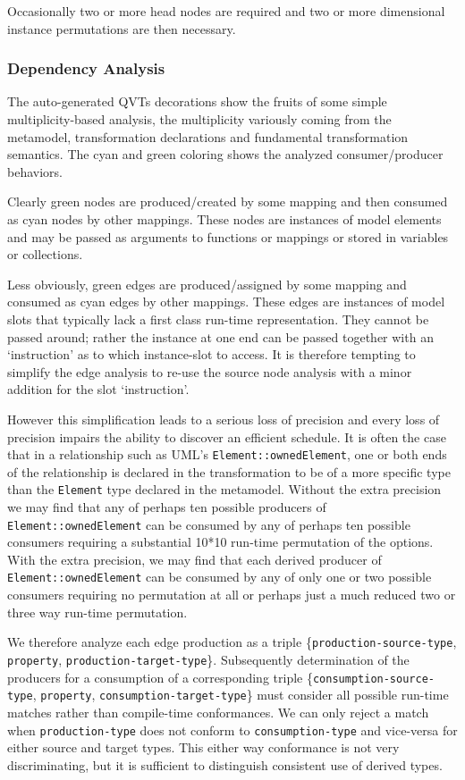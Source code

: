 \documentclass{jot}
\begin{document}
Occasionally two or more head nodes are required and two or more dimensional instance permutations are then necessary.

\subsubsection{Dependency Analysis}

The auto-generated QVTs decorations show the fruits of some simple multiplicity-based analysis, the multiplicity variously coming from the metamodel, transformation declarations and fundamental transformation semantics. The cyan and green coloring shows the analyzed consumer/producer behaviors.

Clearly green nodes are produced/created by some mapping and then consumed as cyan nodes by other mappings. These nodes are instances of model elements and may be passed as arguments to functions or mappings or stored in variables or collections.

Less obviously, green edges are produced/assigned by some mapping and consumed as cyan edges by other mappings. These edges are instances of model slots that typically lack a first class run-time representation. They cannot be passed around; rather the instance at one end can be passed together with an `instruction' as to which instance-slot to access. It is therefore tempting to simplify the edge analysis to re-use the source node analysis with a minor addition for the slot `instruction'.

However this simplification leads to a serious loss of precision and every loss of precision impairs the ability to discover an efficient schedule. It is often the case that in a relationship such as UML's \verb|Element::ownedElement|, one or both ends of the relationship is declared in the transformation to be of a more specific type than the \verb|Element| type declared in the metamodel. Without the extra precision we may find that any of perhaps ten possible producers of \verb|Element::ownedElement| can be consumed by any of perhaps ten possible consumers requiring a substantial 10*10 run-time permutation of the options. With the extra precision, we may find that each derived producer of \verb|Element::ownedElement| can be consumed by any of only one or two  possible consumers requiring no permutation at all or perhaps just a much reduced two or three way run-time permutation.

We therefore analyze each edge production as a triple \{\verb|production-source-type|, \verb|property|, \verb|production-target-type|\}. Subsequently determination of the producers for a consumption of a corresponding triple \{\verb|consumption-source-type|, \verb|property|, \verb|consumption-target-type|\} must consider all possible run-time matches rather than compile-time conformances. We can only reject a match when 
 \verb|production-type| does not conform to \verb|consumption-type| and vice-versa for either source and target types. This either way conformance is not very discriminating, but it is sufficient to distinguish consistent use of derived types.
\end{document}
